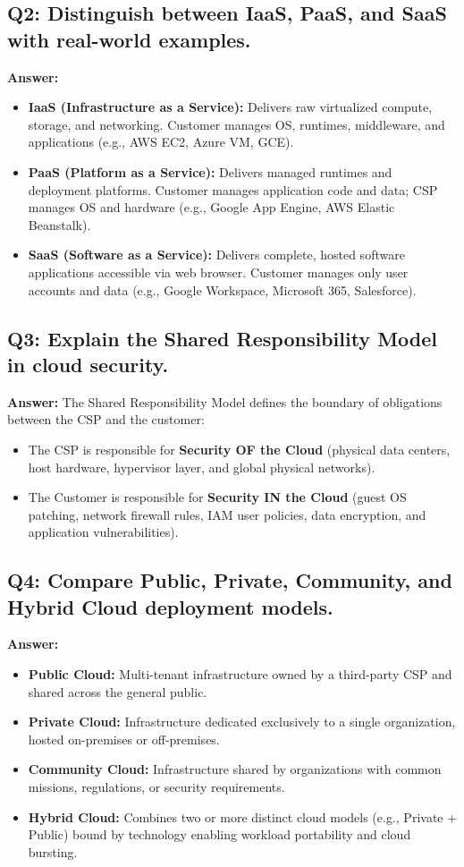 \subsection*{Q2: Distinguish between IaaS, PaaS, and SaaS with real-world examples.}
\textbf{Answer:}
\begin{itemize}
    \item \textbf{IaaS (Infrastructure as a Service):} Delivers raw virtualized compute, storage, and networking. Customer manages OS, runtimes, middleware, and applications (e.g., AWS EC2, Azure VM, GCE).
    \item \textbf{PaaS (Platform as a Service):} Delivers managed runtimes and deployment platforms. Customer manages application code and data; CSP manages OS and hardware (e.g., Google App Engine, AWS Elastic Beanstalk).
    \item \textbf{SaaS (Software as a Service):} Delivers complete, hosted software applications accessible via web browser. Customer manages only user accounts and data (e.g., Google Workspace, Microsoft 365, Salesforce).
\end{itemize}

\subsection*{Q3: Explain the Shared Responsibility Model in cloud security.}
\textbf{Answer:} The Shared Responsibility Model defines the boundary of obligations between the CSP and the customer:
\begin{itemize}
    \item The CSP is responsible for \textbf{Security OF the Cloud} (physical data centers, host hardware, hypervisor layer, and global physical networks).
    \item The Customer is responsible for \textbf{Security IN the Cloud} (guest OS patching, network firewall rules, IAM user policies, data encryption, and application vulnerabilities).
\end{itemize}

\subsection*{Q4: Compare Public, Private, Community, and Hybrid Cloud deployment models.}
\textbf{Answer:}
\begin{itemize}
    \item \textbf{Public Cloud:} Multi-tenant infrastructure owned by a third-party CSP and shared across the general public.
    \item \textbf{Private Cloud:} Infrastructure dedicated exclusively to a single organization, hosted on-premises or off-premises.
    \item \textbf{Community Cloud:} Infrastructure shared by organizations with common missions, regulations, or security requirements.
    \item \textbf{Hybrid Cloud:} Combines two or more distinct cloud models (e.g., Private + Public) bound by technology enabling workload portability and cloud bursting.
\end{itemize}

